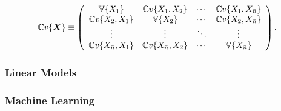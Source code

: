 \documentclass[../main.tex]{subfiles}
\begin{document}
\begin{equation}
    \mathbb{C}v\{\boldsymbol{X}\}\equiv\left( \begin{array}
    [c]{cccc}\mathbb{V}\{X_{1}\} & \mathbb{C}v\{X_{1},X_{2}\} & \cdots & \mathbb{C}v\{X_{1},X_{\bar{n}}\}\\
    \mathbb{C}v\{X_{2},X_{1}\} & \mathbb{V}\{X_{2}\} & \cdots & \mathbb{C}v\{X_{2},X_{\bar{n}}\}\\
    \vdots & \vdots & \ddots & \vdots\\
    \mathbb{C}v\{X_{\bar{n}},X_{1}\} & \mathbb{C}v\{X_{\bar{n}},X_{2}\} & \cdots & \mathbb{V}\{X_{\bar{n}}\}
    \end{array} \right) \text{.}
    \end{equation}











































































\subsubsection{Linear Models}

\subsubsection{Machine Learning}
\end{document}
